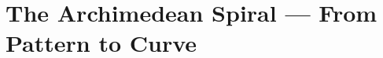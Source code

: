 \documentclass[12pt,a4paper]{report}
\theoremstyle{plain}
\theoremstyle{definition}
\theoremstyle{remark}
\begin{document}



%



\part{The Archimedean Spiral --- From Pattern to Curve}
%
%






\end{document}
